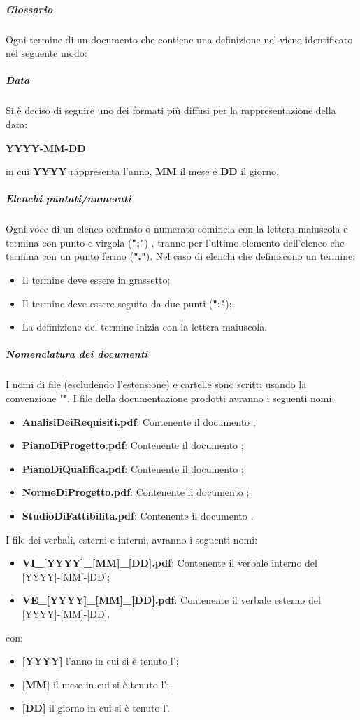 \subparagraph*{Glossario}
Ogni termine di un documento che contiene una definizione nel \Glossario{} viene identificato nel seguente modo:
\begin{center}
\end{center}

\subparagraph*{Data}
Si è deciso di seguire uno dei formati più diffusi per la rappresentazione della data:
\begin{center}
\textbf{YYYY-MM-DD}
\end{center}
in cui \textbf{YYYY} rappresenta l'anno, \textbf{MM} il mese e \textbf{DD} il giorno.
\subparagraph*{Elenchi puntati/numerati}
Ogni voce di un elenco ordinato o numerato comincia con la lettera maiuscola e termina con punto e virgola (\textbf{";"}) , tranne per l'ultimo elemento dell'elenco che termina con un punto fermo (\textbf{"."}).
Nel caso di elenchi che definiscono un termine:
\begin{itemize}
    \item Il termine deve essere in grassetto;
    \item Il termine deve essere seguito da due punti (\textbf{":"});
    \item La definizione del termine inizia con la lettera maiuscola.
\end{itemize}

\subparagraph*{Nomenclatura dei documenti}
I nomi di file (escludendo l'estensione) e cartelle sono scritti usando la convenzione "".
I file della documentazione prodotti avranno i seguenti nomi:
\begin{itemize}
    \item \textbf{AnalisiDeiRequisiti.pdf}: Contenente il documento \AdR{};
    \item \textbf{PianoDiProgetto.pdf}: Contenente il documento \PdP{};
    \item \textbf{PianoDiQualifica.pdf}: Contenente il documento \PdQ{};
    \item \textbf{NormeDiProgetto.pdf}: Contenente il documento \NdP{};
    \item \textbf{StudioDiFattibilita.pdf}: Contenente il documento \SdF{}.
\end{itemize}
I file dei verbali, esterni e interni, avranno i seguenti nomi:
\begin{itemize}
    \item \textbf{VI\_[YYYY]\_[MM]\_[DD].pdf}: Contenente il verbale interno del [YYYY]-[MM]-[DD];
    \item \textbf{VE\_[YYYY]\_[MM]\_[DD].pdf}: Contenente il verbale esterno del [YYYY]-[MM]-[DD].
\end{itemize}
con:
\begin{itemize}
    \item \textbf{[YYYY]} l'anno in cui si è tenuto l';
    \item \textbf{[MM]} il mese in cui si è tenuto l';
    \item \textbf{[DD]} il giorno in cui si è tenuto l'.
\end{itemize}

